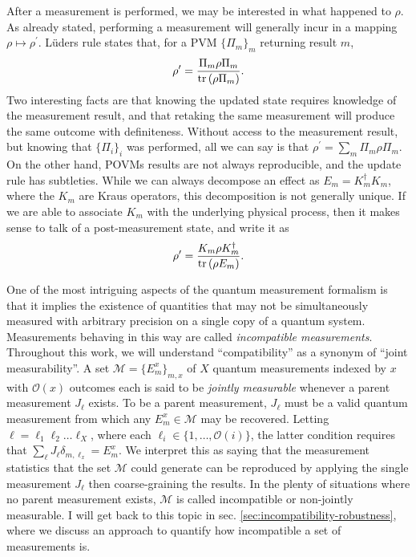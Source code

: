 		After a measurement is performed, we may be interested in what happened to $\rho$. As already stated, performing a measurement will generally incur in a mapping $\rho \mapsto \rho^\prime$. Lüders rule states that, for a PVM $\{ \Pi_m \}_m$ returning result $m$,
		\begin{equation}
			\rho^\prime = \frac{\Pi_m \rho \Pi_m}{\text{tr}\left( \rho \Pi_m \right)} .
			\label{eq:luders-rule}
		\end{equation}
		Two interesting facts are that knowing the updated state requires knowledge of the measurement result, and that retaking the same measurement will produce the same outcome with definiteness. Without access to the measurement result, but knowing that $\{ \Pi_i \}_i$ was performed, all we can say is that $\rho^\prime = \sum_m \Pi_m \rho \Pi_m$. On the other hand, POVMs results are not always reproducible, and the update rule has subtleties. While we can always decompose an effect as $E_m = K_m^\dagger K_m$, where the $K_m$ are Kraus operators, this decomposition is not generally unique. If we are able to associate $K_m$ with the underlying physical process, then it makes sense to talk of a post-measurement state, and write it as
		$$
			\rho^\prime = \frac{K_m \rho K_m^\dagger}{\text{tr}\left( \rho E_m \right)} .
		$$
		
		One of the most intriguing aspects of the quantum measurement formalism is that it implies the existence of quantities that may not be simultaneously measured with arbitrary precision on a single copy of a quantum system. Measurements behaving in this way are called \emph{incompatible measurements}. Throughout this work, we will understand ``compatibility'' as a synonym of ``joint measurability''. A set $\mathcal{M} = \{E_m^x \}_{m, x}$ of $X$ quantum measurements indexed by $x$ with $\mathcal{O}(x)$ outcomes each is said to be \emph{jointly measurable} whenever a parent measurement $J_\ell$ exists. To be a parent measurement, $J_\ell$ must be a valid quantum measurement from which any $E_m^x \in \mathcal{M}$ may be recovered. Letting $\ell = \ell_1\ell_2\ldots\ell_X$, where each $\ell_i \in \{ 1, \ldots, \mathcal{O}(i) \}$, the latter condition requires that $\sum_\ell J_\ell \delta_{m, \ell_x} = E_m^x$. We interpret this as saying that the measurement statistics that the set $\mathcal{M}$ could generate can be reproduced by applying the single measurement $J_\ell$ then coarse-graining the results. In the plenty of situations where no parent measurement exists, $\mathcal{M}$ is called incompatible or non-jointly measurable. I will get back to this topic in sec. \ref{sec:incompatibility-robustness}, where we discuss an approach to quantify how incompatible a set of measurements is.
		
